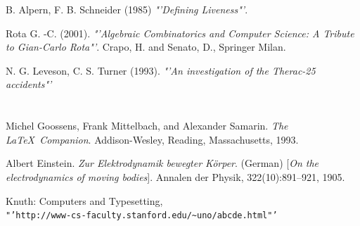 \documentclass{article}%
\begin{document}
\begin{thebibliography}{9}
B. Alpern, F. B. Schneider (1985)
\textit{"'Defining Liveness"'}. 

Rota G. -C. (2001).
\textit{"'Algebraic Combinatorics and Computer Science: A Tribute to Gian-Carlo Rota"'}.
Crapo, H. and Senato, D., Springer Milan.

\bibitem{}
N. G. Leveson, C. S. Turner (1993).
\textit{"'An investigation of the Therac-25 accidents"'}\\
\\\\
Michel Goossens, Frank Mittelbach, and Alexander Samarin. 
\textit{The \LaTeX\ Companion}. 
Addison-Wesley, Reading, Massachusetts, 1993.

Albert Einstein. 
\textit{Zur Elektrodynamik bewegter K{\"o}rper}. (German) 
[\textit{On the electrodynamics of moving bodies}]. 
Annalen der Physik, 322(10):891–921, 1905.

Knuth: Computers and Typesetting, \\
\texttt{"'http://www-cs-faculty.stanford.edu/\~{}uno/abcde.html"'}

\end{thebibliography}
\end{document}
